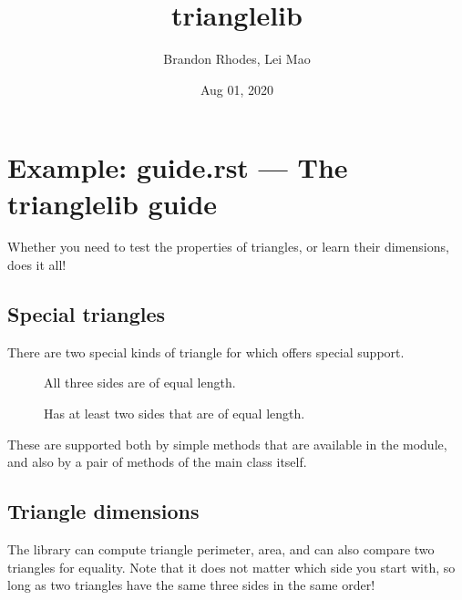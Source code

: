 \documentclass[letterpaper,10pt,english]{sphinxmanual}
\title{trianglelib}
\date{Aug 01, 2020}
\author{Brandon Rhodes, Lei Mao}
\begin{document}
\pagestyle{empty}
\sphinxmaketitle
\pagestyle{plain}
\sphinxtableofcontents
\pagestyle{normal}
\label{\detokenize{index::doc}}



\chapter{Example: guide.rst — The trianglelib guide}
\label{\detokenize{guide:example-guide-rst-the-trianglelib-guide}}\label{\detokenize{guide::doc}}
Whether you need to test the properties of triangles,
or learn their dimensions, {\hyperref[\detokenize{api:module-trianglelib}]{}} does it all!


\section{Special triangles}
\label{\detokenize{guide:special-triangles}}
There are two special kinds of triangle
for which {\hyperref[\detokenize{api:module-trianglelib}]{}} offers special support.
\begin{description}
\item[{}] \leavevmode
All three sides are of equal length.

\item[{}] \leavevmode
Has at least two sides that are of equal length.

\end{description}

These are supported both by simple methods
that are available in the {\hyperref[\detokenize{api:module-trianglelib.utils}]{}} module,
and also by a pair of methods of the main
{\hyperref[\detokenize{api:trianglelib.shape.Triangle}]{}} class itself.


\section{Triangle dimensions}
\label{\detokenize{guide:triangle-dimensions}}\label{\detokenize{guide:id1}}
The library can compute triangle perimeter, area,
and can also compare two triangles for equality.
Note that it does not matter which side you start with,
so long as two triangles have the same three sides in the same order!
\end{document}

